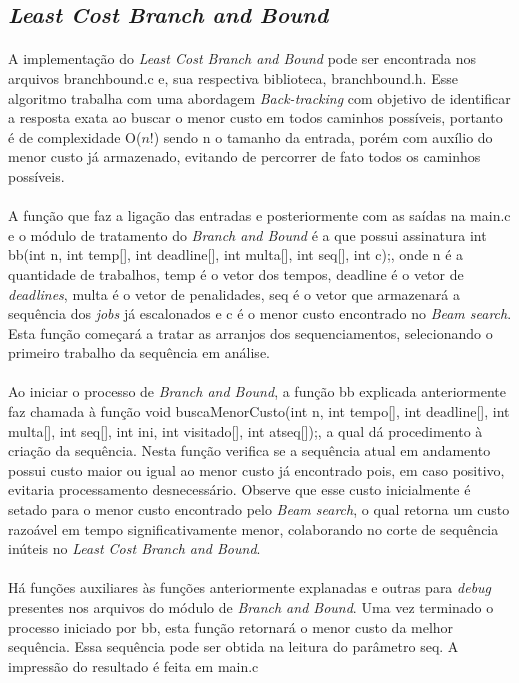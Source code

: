 \documentclass[12pt,a4paper]{article}
\begin{document}
  \subsection{{\it Least Cost Branch and Bound}}
   {\paragraph{} A implementação do {\it Least Cost Branch and Bound} pode ser encontrada nos arquivos branchbound.c e, sua respectiva biblioteca, branchbound.h. Esse algoritmo trabalha com uma abordagem {\it Back-tracking} com objetivo de identificar a resposta exata ao buscar o menor custo em todos caminhos possíveis, portanto é de complexidade O($n!$) sendo n o tamanho da entrada, porém com auxílio do menor custo já armazenado, evitando de percorrer de fato todos os caminhos possíveis. }
   {\paragraph{} A função que faz a ligação das entradas e posteriormente com as saídas  na main.c e o módulo de tratamento do {\it Branch and Bound} é a que possui assinatura int bb(int n, int temp[], int deadline[], int multa[], int seq[], int c);, onde n é a quantidade de trabalhos, temp é o vetor dos tempos, deadline é o vetor de {\it deadlines}, multa é o vetor de penalidades, seq é o vetor que armazenará a sequência dos {\it jobs} já escalonados e c é o menor custo encontrado no {\it Beam search}. Esta função começará a tratar as arranjos dos sequenciamentos, selecionando o primeiro trabalho da sequência em análise. }
   {\paragraph{} Ao iniciar o processo de {\it Branch and Bound}, a função bb explicada anteriormente faz chamada à função void buscaMenorCusto(int n, int tempo[], int deadline[], int multa[], int seq[], int ini, int visitado[], int atseq[]);, a qual dá procedimento à criação da sequência. Nesta função verifica se a sequência atual em andamento possui custo maior ou igual ao menor custo já encontrado pois, em caso positivo, evitaria processamento desnecessário. Observe que esse custo inicialmente é setado para o menor custo encontrado pelo {\it Beam search}, o qual retorna um custo razoável em tempo significativamente menor, colaborando no corte de sequência inúteis no {\it Least Cost Branch and Bound}. }
   {\paragraph{} Há funções auxiliares às funções anteriormente explanadas e outras para {\it debug} presentes nos arquivos do módulo de {\it Branch and Bound}. Uma vez terminado o processo iniciado por bb, esta função retornará o menor custo da melhor sequência. Essa sequência pode ser obtida na leitura do parâmetro seq. A impressão do resultado é feita em main.c }
  
\end{document}
